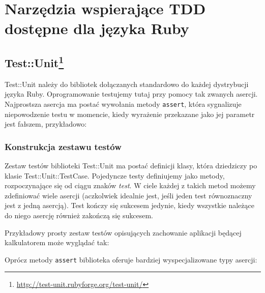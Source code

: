  \section{Narzędzia wspierające TDD dostępne dla języka Ruby}
    
    \subsection[Test::Unit]{Test::Unit\footnote{\url{http://test-unit.rubyforge.org/test-unit/}\nocite{test_unit}}}
    
    Test::Unit należy do bibliotek dołączanych standardowo do każdej dystrybucji języka Ruby. Oprogramowanie testujemy tutaj przy pomocy tak zwanych asercji. Najprostsza asercja ma postać wywołania metody \verb+assert+, która sygnalizuje niepowodzenie testu w momencie, kiedy wyrażenie przekazane jako jej parametr jest fałszem, przykładowo:
    
    
     
     \subsubsection{Konstrukcja zestawu testów}
     Zestaw testów biblioteki Test::Unit ma postać definicji klasy, która dziedziczy po klasie Test::Unit::TestCase. Pojedyncze testy definiujemy jako metody, rozpoczynające się od ciągu znaków \emph{test}. W ciele każdej z takich metod możemy zdefiniować wiele asercji (aczkolwiek idealnie jest, jeśli jeden test równoznaczny jest z jedną asercją). Test kończy się sukcesem jedynie, kiedy wszystkie należące do niego asercję również zakończą się sukcesem.
     
     Przykładowy prosty zestaw testów opisujących zachowanie aplikacji będącej kalkulatorem może wyglądać tak:
     
     
     
     Oprócz metody \verb+assert+ biblioteka oferuje bardziej wyspecjalizowane typy asercji:
     

